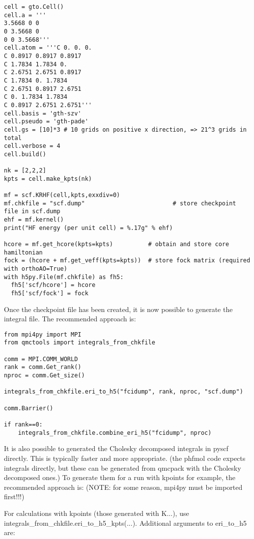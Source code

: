 \begin{itemize}
\begin{lstlisting}[caption=The following is an example PySCF input file for calculations with k-points.]
cell = gto.Cell()
cell.a = '''
3.5668 0 0
0 3.5668 0
0 0 3.5668'''
cell.atom = '''C 0. 0. 0. 
C 0.8917 0.8917 0.8917
C 1.7834 1.7834 0. 
C 2.6751 2.6751 0.8917
C 1.7834 0. 1.7834
C 2.6751 0.8917 2.6751
C 0. 1.7834 1.7834
C 0.8917 2.6751 2.6751'''
cell.basis = 'gth-szv'
cell.pseudo = 'gth-pade'
cell.gs = [10]*3 # 10 grids on positive x direction, => 21^3 grids in total
cell.verbose = 4
cell.build()

nk = [2,2,2]
kpts = cell.make_kpts(nk) 

mf = scf.KRHF(cell,kpts,exxdiv=0)
mf.chkfile = "scf.dump"                         # store checkpoint file in scf.dump
ehf = mf.kernel()
print("HF energy (per unit cell) = %.17g" % ehf)

hcore = mf.get_hcore(kpts=kpts)          # obtain and store core hamiltonian
fock = (hcore + mf.get_veff(kpts=kpts))  # store fock matrix (required with orthoAO=True)
with h5py.File(mf.chkfile) as fh5:
  fh5['scf/hcore'] = hcore
  fh5['scf/fock'] = fock
\end{lstlisting}
\end{itemize}

Once the checkpoint file has been created, it is now possible to generate the integral file. The recommended approach is:

\begin{lstlisting}[caption=The following is an example input file for calculating the integrals.]
from mpi4py import MPI
from qmctools import integrals_from_chkfile

comm = MPI.COMM_WORLD
rank = comm.Get_rank()
nproc = comm.Get_size()

integrals_from_chkfile.eri_to_h5("fcidump", rank, nproc, "scf.dump")    

comm.Barrier()

if rank==0:
    integrals_from_chkfile.combine_eri_h5("fcidump", nproc)
\end{lstlisting}

It is also possible to generated the Cholesky decomposed integrals in pyscf directly. This is typically faster and more appropriate. (the phfmol code expects integrals directly, but these can be generated from qmcpack with the Cholesky decomposed ones.) To generate them for a run with kpoints for example, the recommended approach is: (NOTE: for some reason, mpi4py must be imported first!!!)

For calculations with kpoints (those generated with K...), use integrals\_from\_chkfile.eri\_to\_h5\_kpts(...).
Additional arguments to eri\_to\_h5 are:

